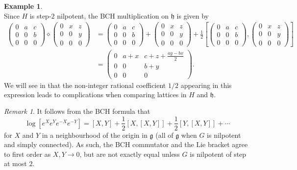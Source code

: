 \documentclass[11pt]{article}
\numberwithin{equation}{section}
\theoremstyle{plain}
\theoremstyle{definition}
\newtheorem{example}[thm]{Example}
\theoremstyle{remark}
\newtheorem{remark}{Remark}[section]
\numberwithin{equation}{section}
\numberwithin{equation}{section}
\begin{document}
\begin{example}
\[\]
Since $H$ is step-$2$ nilpotent, the BCH multiplication on $\mathfrak{h}$ is given by
\begin{align*}
\left(\begin{matrix} 0 & a & c \\ 0 & 0 & b \\ 0&0&0\end{matrix}\right)\diamond \left(\begin{matrix} 0 & x & z \\ 0 & 0 & y \\ 0&0&0\end{matrix}\right) 
&=\left(\begin{matrix} 0 & a & c \\ 0 & 0 & b \\ 0&0&0\end{matrix}\right) + \left(\begin{matrix} 0 & x & z \\ 0 & 0 & y \\ 0&0&0\end{matrix}\right) +  \frac{1}{2}\left[\left(\begin{matrix} 0 & a & c \\ 0 & 0 & b \\ 0&0&0\end{matrix}\right),\left(\begin{matrix} 0 & x & z \\ 0 & 0 & y \\ 0&0&0\end{matrix}\right)\right] \\
&=\left(\begin{matrix} 0 & a+x & c+z+\frac{ay-bx}{2} \\ 0 & 0 & b+y \\ 0&0&0\end{matrix}\right).
\end{align*}
We will see in  that the non-integer rational coefficient $1/2$ appearing in this expression leads to complications when comparing lattices in $H$ and $\mathfrak{h}$.
\end{example}

\begin{remark}
It follows from the BCH formula that
\[
\log [e^X e^Y e^{-X}e^{-Y}] 
%
%
= [X,Y]+\frac{1}{2}[X,[X,Y]]+\frac{1}{2}[Y,[X,Y]]+\cdots
\]
for $X$ and $Y$ in a neighbourhood of the origin in $\mathfrak{g}$ (all of $\mathfrak{g}$ when $G$ is nilpotent and simply connected). As such, the BCH commutator and the Lie bracket agree to first order as $X,Y\to 0$, but are not exactly equal unless $G$ is nilpotent of step at most $2$.
\end{remark}
\end{document}
